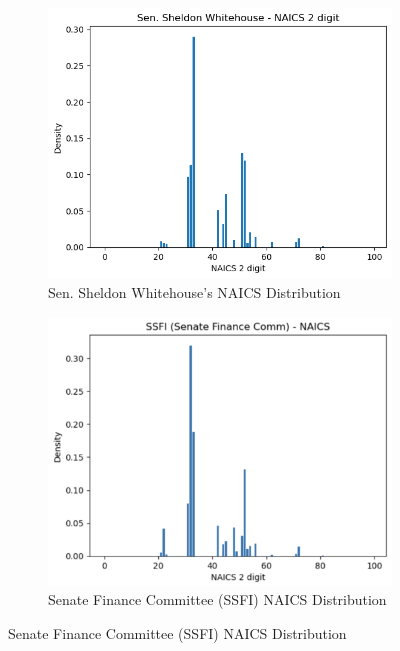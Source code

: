 \documentclass[15pt,letterpaper]{article}
\begin{document}
\begin{figure}[ht]
  \centering
  \begin{subfigure}[b]{0.3\textwidth}
      \includegraphics[width=\textwidth, height=0.2\textheight]{imgs/sheldonwhite.png}
      \caption{Sen. Sheldon Whitehouse's NAICS Distribution}
      \label{fig:senator_density}
  \end{subfigure}
  \hfill
  \begin{subfigure}[b]{0.3\textwidth}
      \includegraphics[width=\textwidth, height=0.2\textheight]{imgs/ssfi-entire2.png}
      \caption{Senate Finance Committee (SSFI) NAICS Distribution}
      \label{fig:ssfi_density}

\end{subfigure}
\end{figure}
\end{document}

